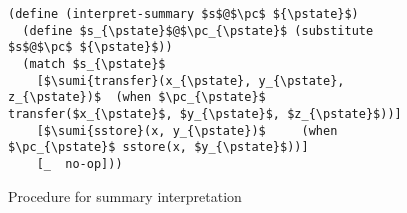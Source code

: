 
\begin{figure}[!t]
  \centering
  \begin{minipage}{0.5\linewidth}
\begin{lstlisting}[linewidth=8cm] 
(define (interpret-summary $s$@$\pc$ ${\pstate}$) 
  (define $s_{\pstate}$@$\pc_{\pstate}$ (substitute $s$@$\pc$ ${\pstate}$))
  (match $s_{\pstate}$
    [$\sumi{transfer}(x_{\pstate}, y_{\pstate}, z_{\pstate})$  (when $\pc_{\pstate}$ transfer($x_{\pstate}$, $y_{\pstate}$, $z_{\pstate}$))]
    [$\sumi{sstore}(x, y_{\pstate})$     (when $\pc_{\pstate}$ sstore(x, $y_{\pstate}$))]
    [_  no-op]))
\end{lstlisting}
\end{minipage}
\vspace{-0.1in}
		\caption{Procedure for summary interpretation}
		\vspace{-0.1in}
      \label{fig:sum-inter}
\end{figure}